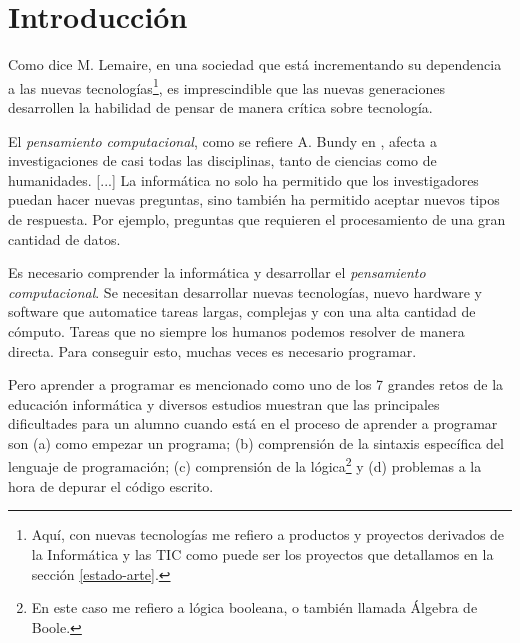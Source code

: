 \chapter{Introducción}\label{introduccion}



Como dice M. Lemaire\cite{lemaire2014incorporating}, en una sociedad que está incrementando su dependencia a las nuevas tecnologías\footnote{Aquí, con nuevas tecnologías me refiero a productos y proyectos derivados de la Informática y las \acrfull{TIC} como puede ser los proyectos que detallamos en la sección \ref{estado-arte}.}, es imprescindible que las nuevas generaciones desarrollen la habilidad de pensar de manera crítica sobre tecnología.

{\color{blue}
El \emph{pensamiento computacional}, como se refiere A. Bundy en \cite{bundy2007computational}, afecta a  investigaciones de casi todas las disciplinas, tanto de ciencias como de humanidades. [...] La informática no solo ha permitido que los investigadores puedan hacer nuevas preguntas, sino también ha permitido aceptar nuevos tipos de respuesta. Por ejemplo, preguntas que requieren el procesamiento de una gran cantidad de datos.

Es necesario comprender la informática y desarrollar el \emph{pensamiento computacional}. Se necesitan desarrollar nuevas tecnologías, nuevo \gls{hardware} y \gls{software} que automatice tareas largas, complejas y con una alta cantidad de cómputo. Tareas que no siempre los humanos podemos resolver de manera directa. Para conseguir esto, muchas veces es necesario programar.
}

Pero aprender a programar es mencionado como uno de los 7 grandes retos de la educación informática \cite{mcgettrick2005grand} y diversos estudios \cite{renumol2009classification} muestran que las principales dificultades para un alumno cuando está en el proceso de aprender a programar son (a) como empezar un programa; (b) comprensión de la sintaxis específica del lenguaje de programación; (c) comprensión de la lógica\footnote{En este caso me refiero a lógica booleana, o también llamada Álgebra de Boole.} y (d) problemas a la hora de depurar el código escrito.

